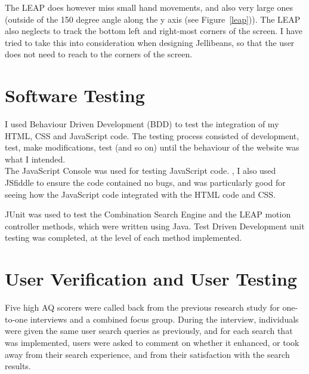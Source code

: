 \documentclass[a4paper, 11pt]{article}
\begin{document}
\vspace{5mm}
The LEAP does however miss small hand movements, and also very large ones (outside of the 150 degree angle along the y axis (see Figure~\ref{leap})). The LEAP also neglects to track the bottom left and right-most corners of the screen. I have tried to take this into consideration when designing Jellibeans, so that the user does not need to reach to the corners of the screen.

\section{Software Testing}

I used Behaviour Driven Development (BDD) to test the integration of my HTML, CSS and JavaScript code. The testing process consisted of development, test, make modifications, test (and so on) until the behaviour of the website was what I intended.\\

\vspace{5mm}
The JavaScript Console was used for testing JavaScript code. \cite{javascripttesting}, I also used JSfiddle \cite{jsfiddle} to ensure the code contained no bugs, and was particularly good for seeing how the JavaScript code integrated with the HTML code and CSS.

\vspace{5mm}
JUnit was used to test the Combination Search Engine and the LEAP motion controller methods, which were written using Java. Test Driven Development unit testing was completed, at the level of each method implemented.

\section{User Verification and User Testing}
Five high AQ scorers were called back from the previous research study for one-to-one interviews and a combined focus group. During the interview, individuals were given the same user search queries as previously, and for each search that was implemented, users were asked to comment on whether it enhanced, or took away from their search experience, and from their satisfaction with the search results. 
\end{document}
